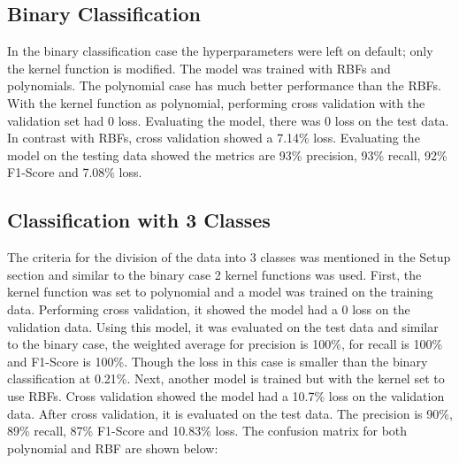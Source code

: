\documentclass[11pt,a4paper,titlepage]{article}
\begin{document}
	\subsection{Binary Classification}
	In the binary classification case the hyperparameters were left on default; only the kernel function is modified. The model was trained with RBFs and polynomials. The polynomial case has much better performance than the RBFs. With the kernel function as polynomial, performing cross validation with the validation set had 0 loss. Evaluating the model, there was 0 loss on the test data. In contrast with RBFs, cross validation showed a 7.14\% loss. Evaluating the model on the testing data showed the metrics are 93\% precision, 93\% recall, 92\% F1-Score and 7.08\% loss.
	\subsection{Classification with 3 Classes}
	The criteria for the  division of the data into 3 classes was mentioned in the Setup section and similar to the binary case 2 kernel functions was used. First, the kernel function was set to polynomial and a model was trained on the training data. Performing cross validation, it showed the model had a 0 loss on the validation data. Using this model, it was evaluated on the test data and similar to the binary case, the weighted average for precision is 100\%, for recall is 100\% and F1-Score is 100\%. Though the loss in this case is smaller than the binary classification at 0.21\%. Next, another model is trained but with the kernel set to use RBFs. Cross validation showed the model had a 10.7\% loss on the validation data. After cross validation, it is evaluated on the test data. The precision is 90\%, 89\% recall, 87\% F1-Score and 10.83\% loss. The confusion matrix for both polynomial and RBF are shown below:
\end{document}
